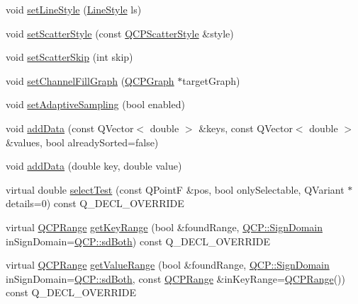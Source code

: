 \begin{DoxyCompactItemize}
void \hyperlink{class_q_c_p_graph_a513fecccff5b2a50ce53f665338c60ff}{set\+Line\+Style} (\hyperlink{class_q_c_p_graph_ad60175cd9b5cac937c5ee685c32c0859}{Line\+Style} ls)
\item 
void \hyperlink{class_q_c_p_graph_a12bd17a8ba21983163ec5d8f42a9fea5}{set\+Scatter\+Style} (const \hyperlink{class_q_c_p_scatter_style}{Q\+C\+P\+Scatter\+Style} \&style)
\item 
void \hyperlink{class_q_c_p_graph_a17cebd3196f434258abb82ba6dc443f2}{set\+Scatter\+Skip} (int skip)
\item 
void \hyperlink{class_q_c_p_graph_a2d03156df1b64037a2e36cfa50351ca3}{set\+Channel\+Fill\+Graph} (\hyperlink{class_q_c_p_graph}{Q\+C\+P\+Graph} $\ast$target\+Graph)
\item 
void \hyperlink{class_q_c_p_graph_ab468cd600160f327836aa0644291e64c}{set\+Adaptive\+Sampling} (bool enabled)
\item 
void \hyperlink{class_q_c_p_graph_ae0555c0d3fe0fa7cb8628f88158d420f}{add\+Data} (const Q\+Vector$<$ double $>$ \&keys, const Q\+Vector$<$ double $>$ \&values, bool already\+Sorted=false)
\item 
void \hyperlink{class_q_c_p_graph_a0bf98b1972286cfb7b1c4b7dd6ae2012}{add\+Data} (double key, double value)
\item 
virtual double \hyperlink{class_q_c_p_graph_a6d669d04462d272c6aa0e5f85846d673}{select\+Test} (const Q\+PointF \&pos, bool only\+Selectable, Q\+Variant $\ast$details=0) const Q\+\_\+\+D\+E\+C\+L\+\_\+\+O\+V\+E\+R\+R\+I\+DE
\item 
virtual \hyperlink{class_q_c_p_range}{Q\+C\+P\+Range} \hyperlink{class_q_c_p_graph_aac47c6189e3aea46ea46939e5d14796c}{get\+Key\+Range} (bool \&found\+Range, \hyperlink{namespace_q_c_p_afd50e7cf431af385614987d8553ff8a9}{Q\+C\+P\+::\+Sign\+Domain} in\+Sign\+Domain=\hyperlink{namespace_q_c_p_afd50e7cf431af385614987d8553ff8a9aa38352ef02d51ddfa4399d9551566e24}{Q\+C\+P\+::sd\+Both}) const Q\+\_\+\+D\+E\+C\+L\+\_\+\+O\+V\+E\+R\+R\+I\+DE
\item 
virtual \hyperlink{class_q_c_p_range}{Q\+C\+P\+Range} \hyperlink{class_q_c_p_graph_a8f773e56f191a61c06e129e90a604d77}{get\+Value\+Range} (bool \&found\+Range, \hyperlink{namespace_q_c_p_afd50e7cf431af385614987d8553ff8a9}{Q\+C\+P\+::\+Sign\+Domain} in\+Sign\+Domain=\hyperlink{namespace_q_c_p_afd50e7cf431af385614987d8553ff8a9aa38352ef02d51ddfa4399d9551566e24}{Q\+C\+P\+::sd\+Both}, const \hyperlink{class_q_c_p_range}{Q\+C\+P\+Range} \&in\+Key\+Range=\hyperlink{class_q_c_p_range}{Q\+C\+P\+Range}()) const Q\+\_\+\+D\+E\+C\+L\+\_\+\+O\+V\+E\+R\+R\+I\+DE
\end{DoxyCompactItemize}

